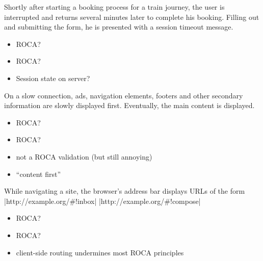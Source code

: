 \documentclass{beamer}
\newcommand{\rocafail}{\ding{55}}
\begin{document}
\begin{frame}
  Shortly after starting a booking process for a train journey, the user is
  interrupted and returns several minutes later to complete his booking. Filling
  out and submitting the form, he is presented with a session timeout message.

  \vspace{0.3cm}
  \begin{itemize}
    \item<1|only@1>[\Large $\square$] \Large ROCA?
    \item<2|only@2>[\Large \rocafail] \Large ROCA?
    \item<2> Session state on server?
  \end{itemize}

\end{frame}

\begin{frame}
  On a slow connection, ads, navigation elements, footers and other secondary
  information are slowly displayed first. Eventually, the main content is displayed.

  \vspace{0.3cm}
  \begin{itemize}
    \item<1|only@1>[\Large $\square$] \Large ROCA?
    \item<2|only@2>[\Large ?] \Large ROCA?
    \item<2> not a ROCA validation (but still annoying)
    \item<2> ``content first''
  \end{itemize}

\end{frame}

\begin{frame}[fragile]
  While navigating a site, the browser's address bar displays URLs of the form
  |http://example.org/#!inbox|
  |http://example.org/#!compose|

  \vspace{0.3cm}
  \begin{itemize}
    \item<1|only@1>[\Large $\square$] \Large ROCA?
    \item<2|only@2>[\Large \rocafail] \Large ROCA?
    \item<2> client-side routing undermines most ROCA principles
  \end{itemize}

\end{frame}
\end{document}
